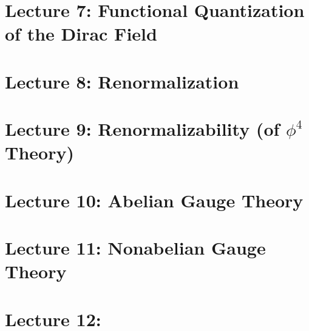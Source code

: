 \documentclass[10pt]{article}
\begin{document}
\section*{Lecture 7: Functional Quantization of the Dirac Field}
\label{sec: lec7}



\clearpage

\section*{Lecture 8: Renormalization}
\label{sec: lec8}



\clearpage

\section*{Lecture 9: Renormalizability (of $\phi^4$ Theory)}
\label{sec: lec9}



\clearpage

\section*{Lecture 10: Abelian Gauge Theory}
\label{sec: lec10}



\clearpage

\section*{Lecture 11: Nonabelian Gauge Theory}
\label{sec: lec11}



\clearpage

\section*{Lecture 12: }
\label{sec: lec12}

%

\end{document}
